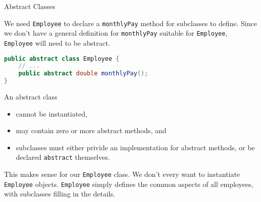 \documentclass{beamer}
\begin{document}
\begin{frame}[fragile]{Abstract Classes}


We need {\tt Employee} to declare a {\tt monthlyPay} method for subclasses to define.  Since we don't have a general definition for {\tt monthlyPay} suitable for {\tt Employee}, {\tt Employee} will need to be abstract.
\begin{lstlisting}[language=Java]
public abstract class Employee {
    // ...
    public abstract double monthlyPay();
}
\end{lstlisting}
An abstract class
\begin{itemize}
\item cannot be instantiated,
\item may contain zero or more abstract methods, and
\item subclasses must either privide an implementation for abstract methods, or be declared {\tt abstract} themselves.
\end{itemize}

This makes sense for our {\tt Employee} class.  We don't every want to instantiate {\tt Employee} objects.  {\tt Employee} simply defines the common aspects of all employees, with subclasses filling in the details.

\end{frame}









\end{document}
